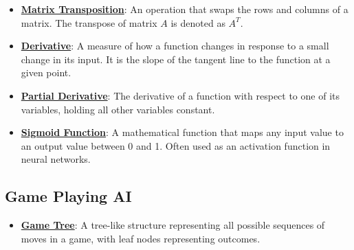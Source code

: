 \documentclass{article}%
\begin{document}
\begin{itemize}[leftmargin=*]
\item \href{\url{https://purdue.brightspace.com/d2l/common/assets/pdfjs-d2l-dist/1.0.14-legacy/web/viewer.html?file=\%252Fcontent\%252Fenforced\%252F1095467-wl.202510.CS.24300.001\%252F04L1-Linear\%20Algebra\%20Primer.pdf\%253Fou\%253D1095467\&lang=en-us\&container=d2l-fileviewer-rendered-pdf\&fullscreen=d2l-fileviewer-rendered-pdf-dialog\&height=667}#page=16}{\textbf{Matrix Transposition}}: An operation that swaps the rows and columns of a matrix. The transpose of matrix $A$ is denoted as $A^T$.%
\item \href{\url{https://purdue.brightspace.com/d2l/common/assets/pdfjs-d2l-dist/1.0.14-legacy/web/viewer.html?file=\%252Fcontent\%252Fenforced\%252F1095467-wl.202510.CS.24300.001\%252F04L1-Linear\%20Algebra\%20Primer.pdf\%253Fou\%253D1095467\&lang=en-us\&container=d2l-fileviewer-rendered-pdf\&fullscreen=d2l-fileviewer-rendered-pdf-dialog\&height=667}#page=21}{\textbf{Derivative}}: A measure of how a function changes in response to a small change in its input. It is the slope of the tangent line to the function at a given point.%
\item \href{\url{https://purdue.brightspace.com/d2l/common/assets/pdfjs-d2l-dist/1.0.14-legacy/web/viewer.html?file=\%252Fcontent\%252Fenforced\%252F1095467-wl.202510.CS.24300.001\%252F04L1-Linear\%20Algebra\%20Primer.pdf\%253Fou\%253D1095467\&lang=en-us\&container=d2l-fileviewer-rendered-pdf\&fullscreen=d2l-fileviewer-rendered-pdf-dialog\&height=667}#page=19}{\textbf{Partial Derivative}}: The derivative of a function with respect to one of its variables, holding all other variables constant.%
\item \href{\url{https://purdue.brightspace.com/d2l/common/assets/pdfjs-d2l-dist/1.0.14-legacy/web/viewer.html?file=\%252Fcontent\%252Fenforced\%252F1095467-wl.202510.CS.24300.001\%252F04L1-Linear\%20Algebra\%20Primer.pdf\%253Fou\%253D1095467\&lang=en-us\&container=d2l-fileviewer-rendered-pdf\&fullscreen=d2l-fileviewer-rendered-pdf-dialog\&height=667}#page=21}{\textbf{Sigmoid Function}}: A mathematical function that maps any input value to an output value between 0 and 1. Often used as an activation function in neural networks.%
\end{itemize}

%
\subsection{Game Playing AI}%
\label{subsec:GamePlayingAI}%
\begin{itemize}[leftmargin=*]%
\item \href{\url{https://purdue.brightspace.com/d2l/common/assets/pdfjs-d2l-dist/1.0.14-legacy/web/viewer.html?file=\%252Fcontent\%252Fenforced\%252F1095467-wl.202510.CS.24300.001\%252F02L2-Intro.pdf\%253Fou\%253D1095467\&lang=en-us\&container=d2l-fileviewer-rendered-pdf\&fullscreen=d2l-fileviewer-rendered-pdf-dialog\&height=667}#page=11}{\textbf{Game Tree}}: A tree-like structure representing all possible sequences of moves in a game, with leaf nodes representing outcomes.%
\end{itemize}
\end{document}
